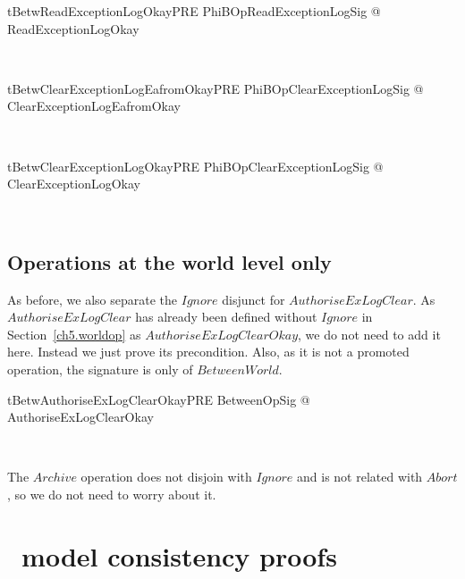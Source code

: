 \begin{LNewThm}
\begin{theorem}{tBetwReadExceptionLogOkayPRE}
   \forall PhiBOpReadExceptionLogSig @ \pre ReadExceptionLogOkay
\end{theorem}~\end{LNewThm}

\begin{LNewThm}
\begin{theorem}{tBetwClearExceptionLogEafromOkayPRE}
   \forall PhiBOpClearExceptionLogSig  @ \pre ClearExceptionLogEafromOkay
\end{theorem}~\end{LNewThm}

\begin{LNewThm}
\begin{theorem}{tBetwClearExceptionLogOkayPRE}
   \forall PhiBOpClearExceptionLogSig @ \pre ClearExceptionLogOkay
\end{theorem}~\end{LNewThm}

\subsection{Operations at the world level only}\label{ch8.specproof-betw.worldlevelalone}

As before, we also separate the $Ignore$ disjunct for $AuthoriseExLogClear$.
As $AuthoriseExLogClear$ has already been defined without $Ignore$ in
Section~\ref{ch5.worldop} as $AuthoriseExLogClearOkay$, we do not need to
add it here. Instead we just prove its precondition.
Also, as it is not a promoted operation, the signature is only of $BetweenWorld$.

\begin{LNewThm}
\begin{theorem}{tBetwAuthoriseExLogClearOkayPRE}
   \forall BetweenOpSig @ \pre AuthoriseExLogClearOkay
\end{theorem}~\end{LNewThm}

The $Archive$ operation does not disjoin with $Ignore$ and is not related with $Abort$,
so we do not need to worry about it.

\section{\Conc\ model consistency proofs}\label{ch8.specproof-conc}

